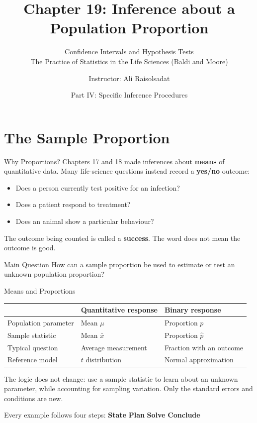\documentclass[aspectratio=169,10pt]{beamer}
\title[Chapter 19: Inference about a Proportion]{\textbf{Chapter 19: Inference about a Population Proportion}}
\subtitle{Confidence Intervals and Hypothesis Tests \\ The Practice of Statistics in the Life Sciences (Baldi and Moore)}
\author{Instructor: Ali Raisolsadat}
\date{Part IV: Specific Inference Procedures}
\newcommand{\step}[1]{\textcolor{CourseBlue}{\textbf{#1}}\quad}
\begin{document}
\begin{frame}
  \titlepage
\end{frame}

\section{The Sample Proportion}

\begin{frame}{Why Proportions?}
Chapters 17 and 18 made inferences about \textbf{means} of quantitative data. Many life-science questions instead record a \textbf{yes/no} outcome:

\vspace{0.2cm}
\begin{itemize}
  \setlength{\itemsep}{0.15cm}
  \item Does a person currently test positive for an infection?
  \item Does a patient respond to treatment?
  \item Does an animal show a particular behaviour?
\end{itemize}

\vspace{0.2cm}
The outcome being counted is called a \textbf{success}. The word does not mean the outcome is good.

\vspace{0.3cm}
\begin{block}{Main Question}
How can a sample proportion be used to estimate or test an unknown population proportion?
\end{block}
\end{frame}

\begin{frame}{Means and Proportions}
\begin{center}
\begin{tabularx}{0.88\textwidth}{>{\RaggedRight\arraybackslash}p{} X X}
\toprule
 & \textbf{Quantitative response} & \textbf{Binary response} \\
\midrule
Population parameter & Mean $\mu$ & Proportion $p$ \\[0.1cm]
Sample statistic & Mean $\bar{x}$ & Proportion $\hat{p}$ \\[0.1cm]
Typical question & Average measurement & Fraction with an outcome \\[0.1cm]
Reference model & $t$ distribution & Normal approximation \\
\bottomrule
\end{tabularx}
\end{center}

\vspace{0.3cm}
The logic does not change: use a sample statistic to learn about an unknown parameter, while accounting for sampling variation. Only the standard errors and conditions are new.

\vspace{0.4cm}
Every example follows four steps: \step{State} \step{Plan} \step{Solve} \textcolor{CourseBlue}{\textbf{Conclude}}
\end{frame}
\end{document}
